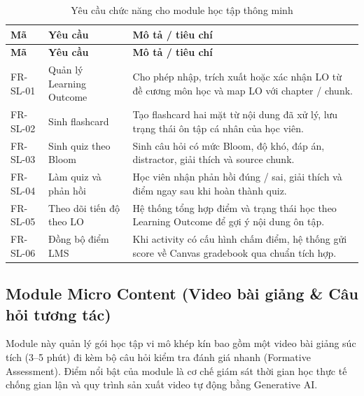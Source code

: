 \begin{longtable}{|p{2.4cm}|p{5.1cm}|p{6.9cm}|}
\caption{Yêu cầu chức năng cho module học tập thông minh}
\label{tab:fr-hoc-tap-thong-minh}\\
\hline
\textbf{Mã} & \textbf{Yêu cầu} & \textbf{Mô tả / tiêu chí} \\
\hline
\endfirsthead
\hline
\textbf{Mã} & \textbf{Yêu cầu} & \textbf{Mô tả / tiêu chí} \\
\hline
\endhead
FR-SL-01 & Quản lý Learning Outcome & Cho phép nhập, trích xuất hoặc xác nhận LO từ đề cương môn học và map LO với chapter / chunk. \\
\hline
FR-SL-02 & Sinh flashcard & Tạo flashcard hai mặt từ nội dung đã xử lý, lưu trạng thái ôn tập cá nhân của học viên. \\
\hline
FR-SL-03 & Sinh quiz theo Bloom & Sinh câu hỏi có mức Bloom, độ khó, đáp án, distractor, giải thích và source chunk. \\
\hline
FR-SL-04 & Làm quiz và phản hồi & Học viên nhận phản hồi đúng / sai, giải thích và điểm ngay sau khi hoàn thành quiz. \\
\hline
FR-SL-05 & Theo dõi tiến độ theo LO & Hệ thống tổng hợp điểm và trạng thái học theo Learning Outcome để gợi ý nội dung ôn tập. \\
\hline
FR-SL-06 & Đồng bộ điểm LMS & Khi activity có cấu hình chấm điểm, hệ thống gửi score về Canvas gradebook qua chuẩn tích hợp. \\
\hline
\end{longtable}

\subsection{Module Micro Content (Video bài giảng \& Câu hỏi tương tác)}
\label{subsec:module-micro-content}

Module này quản lý gói học tập vi mô khép kín bao gồm một video bài giảng súc tích (3--5 phút) đi kèm bộ câu hỏi kiểm tra đánh giá nhanh (Formative Assessment). Điểm nổi bật của module là cơ chế giám sát thời gian học thực tế chống gian lận và quy trình sản xuất video tự động bằng Generative AI.

